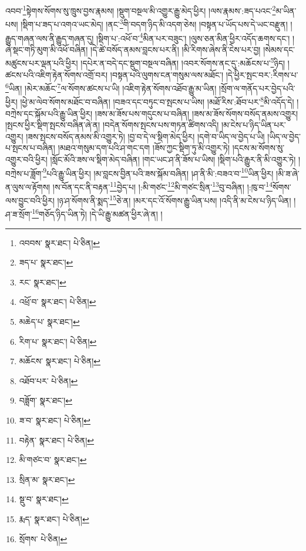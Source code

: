 འབབ་\footnote{འབབས་  སྣར་ཐང་།  པེ་ཅིན། }སྟེགས་སོགས་སུ་ཁྲུས་བྱས་རྣམས། །སྡུག་བསྔལ་མི་འགྱུར་རྒྱུ་མེད་ཕྱིར། །ལས་རྣམས་:ཟད་པའང་\footnote{ཟད་པ་  སྣར་ཐང་། }མ་ཡིན་པས། །སྡིག་པ་ཟད་པ་འགའ་ཡང་མེད། །ནང་\footnote{རང་  སྣར་ཐང་། }གི་བདག་ཉིད་མི་འདག་ཅེས། །བསྟན་པ་ཡོད་པས་དེ་ཡང་བརྫུན། །རྒྱུད་གཞན་ལས་ནི་རྒྱུད་གཞན་དུ། །སྡིག་པ་:འཕོ་བ་\footnote{འཕྲོ་བ་  སྣར་ཐང་།  པེ་ཅིན། }མིན་པར་བཟུང་། །ལུས་ཅན་མིན་ཕྱིར་འདོད་ཆགས་དང་། །ཞེ་སྡང་གཏི་མུག་མི་འཕོ་བཞིན། །དེ་ཚེ་བསོད་ནམས་བླངས་པར་ནི། །མི་རིགས་ཞེས་ནི་ངེས་པར་བྱ། །སེམས་དང་མཚུངས་པར་ལྡན་པའི་ཕྱིར། །དཔེར་ན་བདེ་དང་སྡུག་བསྔལ་བཞིན། །འབར་སོགས་ནང་དུ་:མཆོངས་པ་\footnote{མཆེད་པ་  སྣར་ཐང་། }ཉིད། །ཚངས་པའི་འཇིག་རྟེན་སོགས་འགྲོ་བར། །བསྟན་པའི་ལུགས་ངན་གསུམ་ལས་མཐོང་། །དེ་ཕྱིར་སྤང་བར་:རིགས་པ་\footnote{རིག་པ་  སྣར་ཐང་།  པེ་ཅིན། }ཡིན། །མེར་མཆོང་\footnote{མཆོངས་  སྣར་ཐང་།  པེ་ཅིན། }ལ་སོགས་ཚངས་པ་ཡི། །འཇིག་རྟེན་སོགས་འཐོབ་རྒྱུ་མ་ཡིན། །སྲོག་ལ་གནོད་པར་བྱེད་པའི་ཕྱིར། །ཕྱེ་མ་ལེབ་སོགས་མཐོང་བ་བཞིན། །བཟའ་དང་བཏུང་བ་སྤངས་པ་ཡིས། །མཐོ་རིས་:ཐོབ་པར་\footnote{འཐོབ་པར་  པེ་ཅིན། }མི་འདོད་དེ། །བཀྲེས་དང་སྐོམ་པའི་རྒྱུ་ཡིན་ཕྱིར། །ཟས་མ་ཟོས་པས་གདུངས་པ་བཞིན། །ཟས་མ་ཟོས་སོགས་བསོད་ནམས་འགྱུར། །སྤངས་ཕྱིར་སྡིག་སྤངས་བཞིན་ཞེ་ན། །བདེན་སོགས་སྤངས་པས་གཏན་ཚིགས་འདི། །མ་ངེས་པ་ཉིད་ཡིན་པར་འགྱུར། །ཟས་སྤངས་བསོད་ནམས་མི་འགྱུར་ཏེ། །བྱ་བ་དེ་ལ་སྡིག་མེད་ཕྱིར། །དགེ་བ་ཡིད་ལ་བྱེད་པ་ཡི། །ཡིད་ལ་བྱེད་པ་སྤངས་པ་བཞིན། །མཐའ་གསུམ་དག་པའི་ཤ་གང་དག །ཟོས་ཀྱང་སྡིག་ཏུ་མི་འགྱུར་ཏེ། །དངས་མ་སོགས་སུ་འགྱུར་བའི་ཕྱིར། །སློང་མོའི་ཟས་ལ་སྡིག་མེད་བཞིན། །གང་ཡང་ཤ་ནི་ཟོས་པ་ཡིས། །སྡིག་པའི་རྒྱུར་ནི་མི་འགྱུར་ཏེ། །བཀྲེས་པ་ཟློག་\footnote{བཟློག་  སྣར་ཐང་། }པའི་རྒྱུ་ཡིན་ཕྱིར། །མ་བླངས་བྱིན་པའི་ཟས་སྐོམ་བཞིན། །ཤ་ནི་མི་:བཟའ་བ་\footnote{ཟ་བ་  སྣར་ཐང་།  པེ་ཅིན། }ཡིན་ཕྱིར། །མི་ཟ་ཞེ་ན་ལུས་ལ་རྟོགས། །ས་བོན་དང་ནི་བརྟན་\footnote{བརྟེན་  སྣར་ཐང་།  པེ་ཅིན། }བྱེད་པ། །:མི་གཙང་\footnote{མི་གཙང་བ་  སྣར་ཐང་། }མི་གཙང་སྲིན་\footnote{སྲིན་མ་  སྣར་ཐང་། }བུ་བཞིན། །:ཁུ་བ་\footnote{སྡུ་བ་  སྣར་ཐང་། }སོགས་ལས་བྱུང་བའི་ཕྱིར། །ཉ་ཤ་སོགས་ནི་སྨད་\footnote{རྨད་  སྣར་ཐང་།  པེ་ཅིན། }ཅེ་ན། །མར་དང་འོ་སོགས་རྒྱུ་ཡིན་པས། །འདི་ནི་མ་ངེས་པ་ཉིད་ཡིན། །ཤ་ཟ་སྲོག་\footnote{སྲོགས་  པེ་ཅིན། }གཅོད་ཉིད་ཡིན་ཏེ། །དེ་ཡི་རྒྱུ་མཚན་ཕྱིར་ཞེ་ན། །
